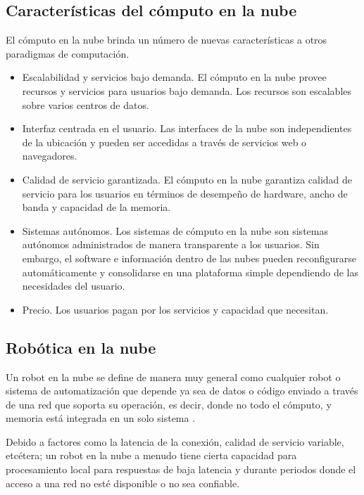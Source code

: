 \subsection{Características del cómputo en la nube}
\label{\detokenize{chapter_one/cloud_computing:caracteristicas-del-computo-en-la-nube}}
El cómputo en la nube brinda un número de nuevas características
a otros paradigmas de computación.
\begin{itemize}
\item {} 
Escalabilidad y servicios bajo demanda. El cómputo en la nube  provee recursos y servicios para usuarios bajo demanda. Los recursos son escalables sobre varios centros de datos.

\item {} 
Interfaz centrada en el usuario. Las interfaces de la nube son independientes de la ubicación y pueden ser accedidas a través de servicios web o navegadores.

\item {} 
Calidad de servicio garantizada. El cómputo en la nube garantiza calidad de servicio para los usuarios en términos de desempeño de hardware, ancho de banda y capacidad de la memoria.

\item {} 
Sistemas autónomos. Los sistemas de cómputo en la nube son sistemas autónomos administrados de manera transparente a los usuarios. Sin embargo, el software e información dentro de las nubes pueden reconfigurarse automáticamente y consolidarse en una plataforma simple dependiendo de las necesidades del usuario.

\item {} 
Precio. Los usuarios pagan por los servicios y capacidad que necesitan.

\end{itemize}


\subsection{Robótica en la nube}
\label{\detokenize{chapter_one/cloud_computing:robotica-en-la-nube}}

\begin{remark}
Un robot en la nube se define de manera muy general como
cualquier robot o sistema de automatización  que depende ya sea de datos o
código enviado a través de una red que soporta su operación, es decir, donde
no todo el cómputo, y memoria está integrada en un solo sistema \cite{benkehoesachinpatilpieterabbeelkengoldberg2014}.\\

\end{remark}
Debido a factores como la latencia de la conexión, calidad de servicio variable, etcétera;
un robot en la nube a menudo tiene cierta capacidad para procesamiento local para
respuestas de baja latencia y durante periodos donde el acceso a una red no esté
disponible o no sea confiable.

